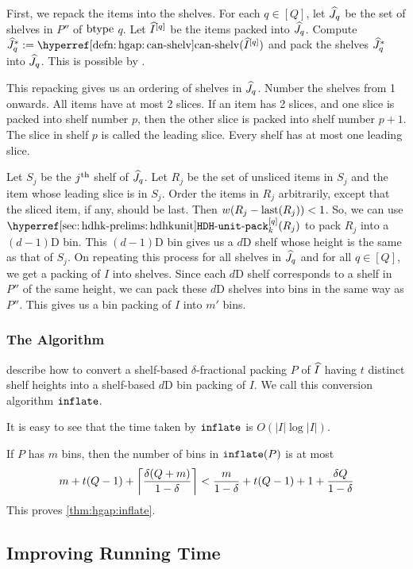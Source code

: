 First, we repack the items into the shelves.
For each $q \in [Q]$, let $\widehat{J}_q$ be the set of shelves in $P''$ of $\operatorname{btype}$ $q$.
Let $\widehat{I}^{[q]}$ be the items packed into $\widehat{J}_q$.
Compute $\Jhat^*_q \defeq \canShelvHyp(\Ihat^{[q]})$ and pack the shelves
$\widehat{J}^*_q$ into $\widehat{J}_q$. This is possible by
.

This repacking gives us an ordering of shelves in $\widehat{J}_q$.
Number the shelves from 1 onwards.
All items have at most 2 slices. If an item has 2 slices, and one slice is packed
into shelf number $p$, then the other slice is packed into shelf number $p+1$.
The slice in shelf $p$ is called the leading slice.
Every shelf has at most one leading slice.

Let $S_j$ be the $j^{\textrm{th}}$ shelf of $\widehat{J}_q$.
Let $R_j$ be the set of unsliced items in $S_j$
and the item whose leading slice is in $S_j$.
Order the items in $R_j$ arbitrarily, except that the sliced item, if any, should be last.
Then $w(R_j - \operatorname{last}(R_j)) < 1$.
So, we can use $\hdhkunitHyp^{[q]}(R_j)$ to pack $R_j$ into a $(d-1)$D bin.
This $(d-1)$D bin gives us a $d$D shelf whose height is the same as that of $S_j$.
On repeating this process for all shelves in $\widehat{J}_q$ and for all $q \in [Q]$,
we get a packing of $I$ into shelves.
Since each $d$D shelf corresponds to a shelf in $P''$ of the same height,
we can pack these $d$D shelves into bins in the same way as $P''$.
This gives us a bin packing of $I$ into $m'$ bins.

\subsubsection{The Algorithm}

describe how to convert a shelf-based $\delta$-fractional packing $P$
of $\widehat{I}$ having $t$ distinct shelf heights into a shelf-based $d$D bin packing of $I$.
We call this conversion algorithm $\operatorname{\mathtt{inflate}}$.

It is easy to see that the time taken by $\operatorname{\mathtt{inflate}}$ is $O(|I|\log|I|)$.

If $P$ has $m$ bins, then the number of bins in $\operatorname{\mathtt{inflate}}(P)$ is at most
\[ m + t(Q-1) + \left\lceil \frac{\delta(Q+m)}{1-\delta} \right\rceil
< \frac{m}{1-\delta} + t(Q-1) + 1 + \frac{\delta Q}{1-\delta} \]
This proves \cref{thm:hgap:inflate}.

\subsection{Improving Running Time}
\label{sec:hgap:improve-time}

